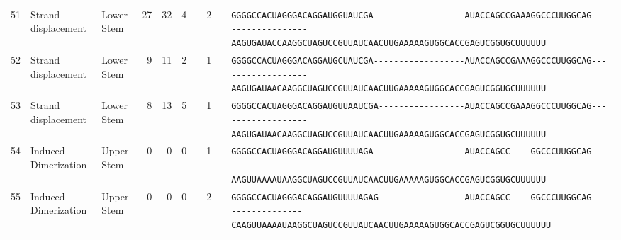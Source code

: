 \begin{tabular}{rllrrrrrcl}
 51 & Strand displacement & Lower Stem & 27 & 32 & 4 &  & 2 &  &
 \color{ucsfdarkgrey}\verb|GGGGCCACUAGGGACAGGAU|\color{ucsforange}\verb|GGUAUC|\color{ucsfblue}\verb|GA------------------|\color{ucsfpurple}\verb|AUACCAGCCGAAAGGCCCUUGGCAG|\color{ucsfblue}\verb|------------------AAGU|\color{ucsforange}\verb|GAUACCAA|\color{ucsfnavy}\verb|GGCUAGUCC|\color{ucsforange}\verb|GUUAUCA|\color{ucsfteal}\verb|ACUUGAAAAAGU|\color{ucsforange}\verb|GGCACCGAGUCGGUGCUUUUUU| \\

 52 & Strand displacement & Lower Stem & 9 & 11 & 2 &  & 1 &  &
 \color{ucsfdarkgrey}\verb|GGGGCCACUAGGGACAGGAU|\color{ucsforange}\verb|GCUAUC|\color{ucsfblue}\verb|GA------------------|\color{ucsfpurple}\verb|AUACCAGCCGAAAGGCCCUUGGCAG|\color{ucsfblue}\verb|------------------AAGU|\color{ucsforange}\verb|GAUAACAA|\color{ucsfnavy}\verb|GGCUAGUCC|\color{ucsforange}\verb|GUUAUCA|\color{ucsfteal}\verb|ACUUGAAAAAGU|\color{ucsforange}\verb|GGCACCGAGUCGGUGCUUUUUU| \\

 53 & Strand displacement & Lower Stem & 8 & 13 & 5 &  & 1 &  &
 \color{ucsfdarkgrey}\verb|GGGGCCACUAGGGACAGGAU|\color{ucsforange}\verb|GUUAAU|\color{ucsfblue}\verb|CGA-----------------|\color{ucsfpurple}\verb|AUACCAGCCGAAAGGCCCUUGGCAG|\color{ucsfblue}\verb|------------------AAGU|\color{ucsforange}\verb|GAUAACAA|\color{ucsfnavy}\verb|GGCUAGUCC|\color{ucsforange}\verb|GUUAUCA|\color{ucsfteal}\verb|ACUUGAAAAAGU|\color{ucsforange}\verb|GGCACCGAGUCGGUGCUUUUUU| \\

 54 & Induced Dimerization & Upper Stem & 0 & 0 & 0 &  & 1 &  &
 \color{ucsfdarkgrey}\verb|GGGGCCACUAGGGACAGGAU|\color{ucsforange}\verb|GUUUUA|\color{ucsfblue}\verb|GA------------------|\color{ucsfpurple}\verb|AUACCAGCC    GGCCCUUGGCAG|\color{ucsfblue}\verb|------------------AAGU|\color{ucsforange}\verb|UAAAAUAA|\color{ucsfnavy}\verb|GGCUAGUCC|\color{ucsforange}\verb|GUUAUCA|\color{ucsfteal}\verb|ACUUGAAAAAGU|\color{ucsforange}\verb|GGCACCGAGUCGGUGCUUUUUU| \\

 55 & Induced Dimerization & Upper Stem & 0 & 0 & 0 &  & 2 &  &
 \color{ucsfdarkgrey}\verb|GGGGCCACUAGGGACAGGAU|\color{ucsforange}\verb|GUUUUA|\color{ucsfblue}\verb|GAG-----------------|\color{ucsfpurple}\verb|AUACCAGCC    GGCCCUUGGCAG|\color{ucsfblue}\verb|-----------------CAAGU|\color{ucsforange}\verb|UAAAAUAA|\color{ucsfnavy}\verb|GGCUAGUCC|\color{ucsforange}\verb|GUUAUCA|\color{ucsfteal}\verb|ACUUGAAAAAGU|\color{ucsforange}\verb|GGCACCGAGUCGGUGCUUUUUU| \\


\end{tabular}
